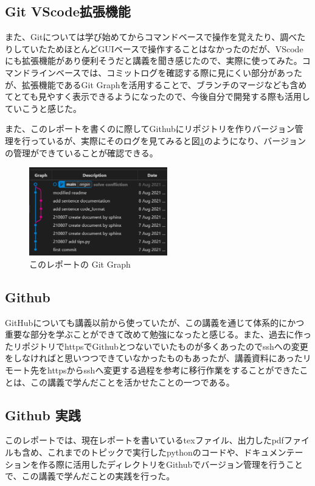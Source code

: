 \documentclass[12pt]{jsarticle}
\begin{document}
\subsection{Git VScode拡張機能}
また、Gitについては学び始めてからコマンドベースで操作を覚えたり、調べたりしていたためほとんどGUIベースで操作することはなかったのだが、VScodeにも拡張機能があり便利そうだと講義を聞き感じたので、実際に使ってみた。コマンドラインベースでは、コミットログを確認する際に見にくい部分があったが、拡張機能であるGit Graphを活用することで、ブランチのマージなども含めてとても見やすく表示できるようになったので、今後自分で開発する際も活用していこうと感じた。

また、このレポートを書くのに際してGithubにリポジトリを作りバージョン管理を行っているが、実際にそのログを見てみると図\ref{fig:gitlog}のようになり、バージョンの管理ができていることが確認できる。

\begin{figure}[htbp]
  \begin{center}
    \includegraphics[width=6.0cm]{./vscode_git.png}
    \caption{このレポートの Git Graph}
    \label{fig:gitlog}
  \end{center}
\end{figure}

\subsection{Github}
GitHubについても講義以前から使っていたが、この講義を通じて体系的にかつ重要な部分を学ぶことができて改めて勉強になったと感じる。また、過去に作ったリポジトリでhttpsでGithubとつないでいたものが多くあったのでsshへの変更をしなければと思いつつできていなかったものもあったが、講義資料にあったリモート先をhttpsからsshへ変更する過程を参考に移行作業をすることができたことは、この講義で学んだことを活かせたことの一つである。

\subsection{Github 実践}
このレポートでは、現在レポートを書いているtexファイル、出力したpdfファイルも含め、これまでのトピックで実行したpythonのコードや、ドキュメンテーションを作る際に活用したディレクトリをGithubでバージョン管理を行うことで、この講義で学んだことの実践を行った。
\end{document}
